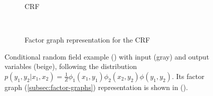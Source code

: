 \begin{figure}
    \centering
    \begin{subfigure}{0.48\textwidth}
        \centering
        \begin{tikzpicture}[thick, on grid, every node/.style={font=\small, scale=1.5}, baseline=(v.south)]
            
        \end{tikzpicture}
        \caption{CRF}
        \label{fig:gm-crf-example}
    \end{subfigure}
    ~
    \begin{subfigure}{0.48\textwidth}
        \centering
        \begin{tikzpicture}[thick, on grid, every node/.style={font=\small, scale=1.5}, baseline=(v.south)]
            
        \end{tikzpicture}
        \caption{Factor graph representation for the CRF}
        \label{fig:gm-crf-example-factor}
    \end{subfigure}
    \caption[Conditional random field example]{Conditional random field example
        () with input (gray) and output variables (beige), following the
        distribution $p(y_1, y_2|x_1, x_2) = \frac{1}{Z}\phi_1(x_1, y_1)\phi_2(x_2,
        y_2)\phi(y_1,y_2)$. Its factor graph (\cref{subsec:factor-graphs}) representation is
        shown in ().}
    \label{fig:gm-crf}
\end{figure}


